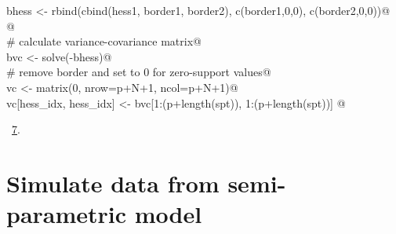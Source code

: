 \documentclass[reqno]{amsart}
\renewcommand{\NWlink}[2]{\hyperlink{#1}{#2}}
\begin{document}
\begin{flushleft}
\begin{list}{}{}
\mbox{}\verb@  bhess <- rbind(cbind(hess1, border1, border2), c(border1,0,0), c(border2,0,0))@\\
\mbox{}\verb@  @\\
\mbox{}\verb@  # calculate variance-covariance matrix@\\
\mbox{}\verb@  bvc <- solve(-bhess)@\\
\mbox{}\verb@  # remove border and set to 0 for zero-support values@\\
\mbox{}\verb@  vc <- matrix(0, nrow=p+N+1, ncol=p+N+1)@\\
\mbox{}\verb@  vc[hess_idx, hess_idx] <- bvc[1:(p+length(spt)), 1:(p+length(spt))]     @\\
\mbox{}\verb@@{\NWsep}
\end{list}
\vspace{-1.5ex}
\footnotesize
\begin{list}{}{\setlength{\itemsep}{-\parsep}\setlength{\itemindent}{-\leftmargin}}
\item \NWtxtMacroRefIn\ \NWlink{nuweb7}{7}.

\item{}
\end{list}
\vspace{4ex}
\end{flushleft}
\section{Simulate data from semi-parametric model}
\end{document}
